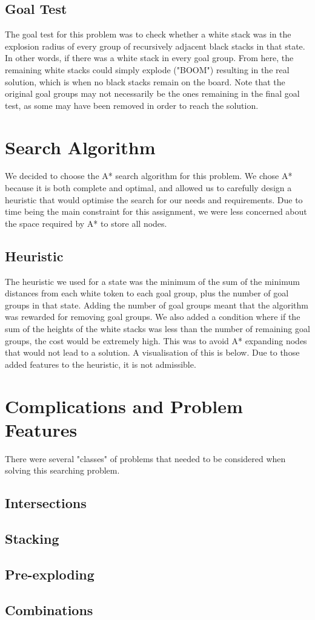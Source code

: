 \documentclass[11pt]{article}
\begin{document}
    \subsection{Goal Test}\label{subsec:goal-test}
    The goal test for this problem was to check whether a white stack was in the explosion radius of every group of
    recursively adjacent black stacks in that state.
    In other words, if there was a white stack in every goal group.
    From here, the remaining white stacks could simply explode ("BOOM") resulting in the real solution, which is when
    no black stacks remain on the board.
    Note that the original goal groups may not necessarily be the ones remaining in the final goal test, as some may
    have been removed in order to reach the solution.
    \section{Search Algorithm}\label{sec:search-algorithm}
    We decided to choose the A* search algorithm for this problem.
    We chose A* because it is both complete and optimal, and allowed us to carefully design a heuristic that would
    optimise the search for our needs and requirements.
    Due to time being the main constraint for this assignment, we were less concerned about the space
    required by A* to store all nodes.
    \subsection{Heuristic}\label{subsec:heuristic}
    The heuristic we used for a state was the minimum of the sum of the minimum distances from each white token to
    each goal group, plus the number of goal groups in that state.
    Adding the number of goal groups meant that the algorithm was rewarded for removing goal groups.
    We also added a condition where if the sum of the heights of the white stacks was less than the number of
    remaining goal groups, the cost would be extremely high.
    This was to avoid A* expanding nodes that would not lead to a solution.
    A visualisation of this is below.
    Due to those added features to the heuristic, it is not admissible.
    \section{Complications and Problem Features}\label{sec:complications-and-problem-features}
    There were several "classes" of problems that needed to be considered when solving this searching problem.
    \subsection{Intersections}\label{subsec:intersections}
    \subsection{Stacking}\label{subsec:stacking}
    \subsection{Pre-exploding}\label{subsec:pre-exploding}
    \subsection{Combinations}\label{subsec:combinations}
\end{document}

